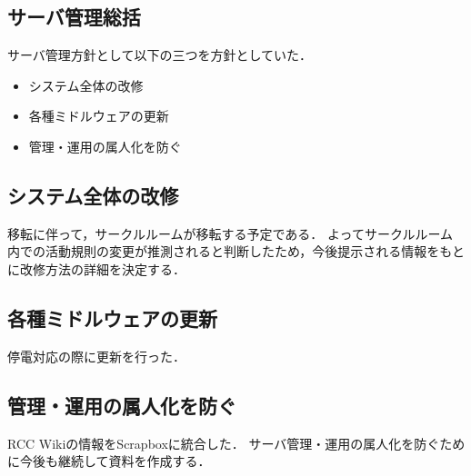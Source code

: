 \subsection*{サーバ管理総括}


サーバ管理方針として以下の三つを方針としていた．
\begin{itemize}
    \item システム全体の改修
    \item 各種ミドルウェアの更新
    \item 管理・運用の属人化を防ぐ
\end{itemize}

\subsection*{システム全体の改修}
移転に伴って，サークルルームが移転する予定である．
よってサークルルーム内での活動規則の変更が推測されると判断したため，今後提示される情報をもとに改修方法の詳細を決定する．

\subsection*{各種ミドルウェアの更新}
停電対応の際に更新を行った．

\subsection*{管理・運用の属人化を防ぐ}
RCC Wikiの情報をScrapboxに統合した．
サーバ管理・運用の属人化を防ぐために今後も継続して資料を作成する．


